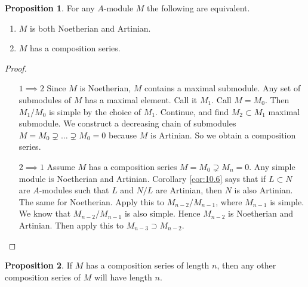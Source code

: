 \documentclass{article}
\theoremstyle{definition}\newtheorem{definition}{Definition}[section]
\theoremstyle{definition}\newtheorem{remark}[definition]{Remark}
\theoremstyle{definition}\newtheorem*{example}{Example}
\theoremstyle{definition}\newtheorem*{note}{Note}
\newtheorem{proposition}[definition]{Proposition}
\begin{document}
\begin{proposition}
For any $ A $-module $ M $ the following are equivalent.
\begin{enumerate}
\item $ M $ is both Noetherian and Artinian.
\item $ M $ has a composition series.
\end{enumerate}
\end{proposition}

\begin{proof}
\hfill
\begin{itemize}[leftmargin=2cm]
\item[$ 1 \implies 2 $] Since $ M $ is Noetherian, $ M $ contains a maximal submodule. Any set of submodules of $ M $ has a maximal element. Call it $ M_1 $. Call $ M = M_0 $. Then $ M_1 / M_0 $ is simple by the choice of $ M_1 $. Continue, and find $ M_2 \subset M_1 $ maximal submodule. We construct a decreasing chain of submodules $ M = M_0 \supsetneq \dots \supsetneq M_0 = 0 $ because $ M $ is Artinian. So we obtain a composition series.
\item[$ 2 \implies 1 $] Assume $ M $ has a composition series $ M = M_0 \supsetneq M_n = 0 $. Any simple module is Noetherian and Artinian. Corollary \ref{cor:10.6} says that if $ L \subset N $ are $ A $-modules such that $ L $ and $ N / L $ are Artinian, then $ N $ is also Artinian. The same for Noetherian. Apply this to $ M_{n - 2} / M_{n - 1} $, where $ M_{n - 1} $ is simple. We know that $ M_{n - 2} / M_{n - 1} $ is also simple. Hence $ M_{n - 2} $ is Noetherian and Artinian. Then apply this to $ M_{n - 3} \supset M_{n - 2} $.
\end{itemize}
\end{proof}

\begin{proposition}
If $ M $ has a composition series of length $ n $, then any other composition series of $ M $ will have length $ n $.
\end{proposition}
\end{document}
